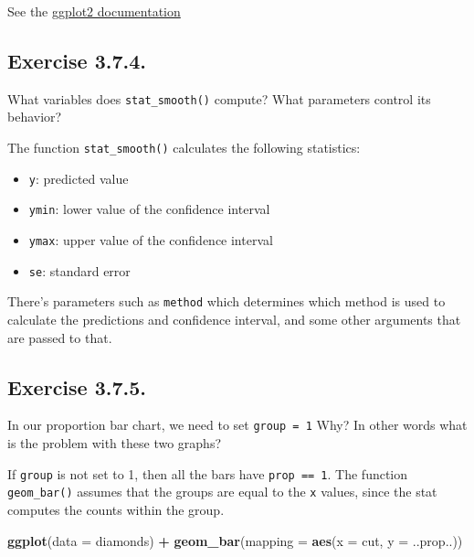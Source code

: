 \documentclass[]{book}
\newenvironment{Shaded}{\begin{snugshade}}{\end{snugshade}}
\newcommand{\DataTypeTok}[1]{\textcolor[rgb]{0.13,0.29,0.53}{#1}}
\newcommand{\KeywordTok}[1]{\textcolor[rgb]{0.13,0.29,0.53}{\textbf{#1}}}
\newcommand{\NormalTok}[1]{#1}
\newcommand{\OperatorTok}[1]{\textcolor[rgb]{0.81,0.36,0.00}{\textbf{#1}}}
\newcommand{\StringTok}[1]{\textcolor[rgb]{0.31,0.60,0.02}{#1}}
\providecommand{\tightlist}{%
  \setlength{\itemsep}{0pt}\setlength{\parskip}{0pt}}
\theoremstyle{plain}
\theoremstyle{remark}
\begin{document}
See the \href{http://docs.ggplot2.org/current/}{ggplot2 documentation}

\hypertarget{exercise-3.7.4.}{%
\subsection*{\texorpdfstring{Exercise
{3.7.4}.}{Exercise 3.7.4.}}\label{exercise-3.7.4.}}

What variables does \texttt{stat\_smooth()} compute? What parameters
control its behavior?

The function \texttt{stat\_smooth()} calculates the following
statistics:

\begin{itemize}
\tightlist
\item
  \texttt{y}: predicted value
\item
  \texttt{ymin}: lower value of the confidence interval
\item
  \texttt{ymax}: upper value of the confidence interval
\item
  \texttt{se}: standard error
\end{itemize}

There's parameters such as \texttt{method} which determines which method
is used to calculate the predictions and confidence interval, and some
other arguments that are passed to that.

\hypertarget{exercise-3.7.5.}{%
\subsection*{\texorpdfstring{Exercise
{3.7.5}.}{Exercise 3.7.5.}}\label{exercise-3.7.5.}}

In our proportion bar chart, we need to set \texttt{group\ =\ 1} Why? In
other words what is the problem with these two graphs?

If \texttt{group} is not set to 1, then all the bars have
\texttt{prop\ ==\ 1}. The function \texttt{geom\_bar()} assumes that the
groups are equal to the \texttt{x} values, since the stat computes the
counts within the group.

\begin{Shaded}
\begin{Highlighting}[]
\KeywordTok{ggplot}\NormalTok{(}\DataTypeTok{data =}\NormalTok{ diamonds) }\OperatorTok{+}
\StringTok{  }\KeywordTok{geom_bar}\NormalTok{(}\DataTypeTok{mapping =} \KeywordTok{aes}\NormalTok{(}\DataTypeTok{x =}\NormalTok{ cut, }\DataTypeTok{y =}\NormalTok{ ..prop..))}
\end{Highlighting}
\end{Shaded}
\end{document}
